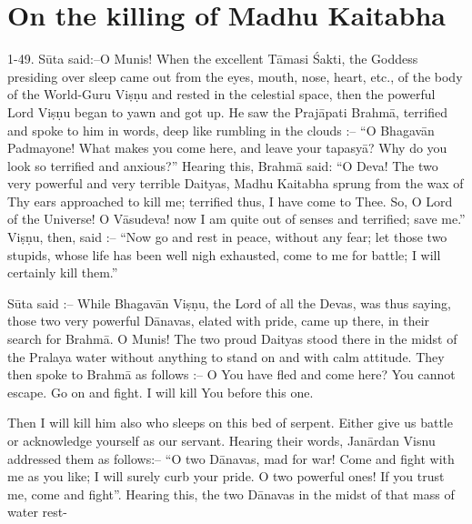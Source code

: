 \chapter{On the killing of Madhu Kaitabha}

1-49. S\=uta said:--O Munis! When the excellent T\=amasi \'Sakti, the Goddess presiding over sleep came out from the eyes, mouth, nose, heart, etc., of the body of the World-Guru Vi\d{s}\d{n}u and rested in the celestial space, then the powerful Lord Vi\d{s}\d{n}u began to yawn and got up. He saw the Praj\=apati Brahm\=a, terrified and spoke to him in words, deep like rumbling in the clouds :-- ``O Bhagav\=an Padmayone! What makes you come here, and leave your tapasy\=a? Why do you look so terrified and anxious?'' Hearing this, Brahm\=a said: ``O Deva! The two very powerful and very terrible Daityas, Madhu Kaitabha sprung from the wax of Thy ears approached to kill me; terrified thus, I have come to Thee. So, O Lord of the Universe! O V\=asudeva! now I am quite out of senses and terrified; save me.'' Vi\d{s}\d{n}u, then, said :-- ``Now go and rest in peace, without any fear; let those two stupids, whose life has been well nigh exhausted, come to me for battle; I will certainly kill them.''

S\=uta said :-- While Bhagav\=an Vi\d{s}\d{n}u, the Lord of all the Devas, was thus saying, those two very powerful D\=anavas, elated with pride, came up there, in their search for Brahm\=a. O Munis! The two proud Daityas stood there in the midst of the Pralaya water without anything to stand on and with calm attitude. They then spoke to Brahm\=a as follows :-- O You have fled and come here? You cannot escape. Go on and fight. I will kill You before this one.

Then I will kill him also who sleeps on this bed of serpent. Either give us battle or acknowledge yourself as our servant. Hearing their words, Jan\=ardan Visnu addressed them as follows:-- ``O two D\=anavas, mad for war! Come and fight with me as you like; I will surely curb your pride. O two powerful ones! If you trust me, come and fight''. Hearing this, the two D\=anavas in the midst of that mass of water rest-

